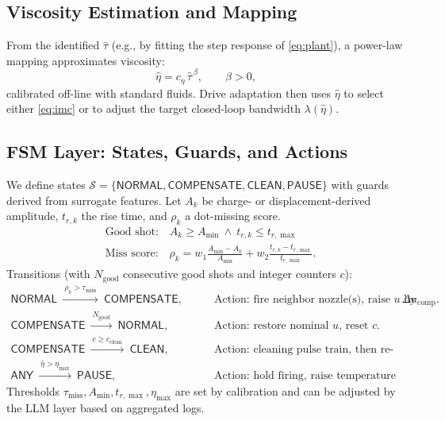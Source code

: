 \subsection{Viscosity Estimation and Mapping}
From the identified $\hat{\tau}$ (e.g., by fitting the step response of \eqref{eq:plant}),
a power-law mapping approximates viscosity:
\begin{equation}
\hat{\eta} = c_\eta\,\hat{\tau}^{\,\beta},\qquad \beta>0,
\end{equation}
calibrated off-line with standard fluids.
Drive adaptation then uses $\hat{\eta}$ to select either \eqref{eq:imc} or to adjust
the target closed-loop bandwidth $\lambda(\hat{\eta})$.

\subsection{FSM Layer: States, Guards, and Actions}
We define states $\mathcal{S}=\{\textsf{NORMAL},\textsf{COMPENSATE},\textsf{CLEAN},\textsf{PAUSE}\}$
with guards derived from surrogate features.
Let $A_k$ be charge- or displacement-derived amplitude, $t_{r,k}$ the rise time,
and $\rho_k$ a dot-missing score.
\begin{align}
&\text{Good shot:}\quad A_k \ge A_{\min}\ \land\ t_{r,k}\le t_{r,\max}\\
&\text{Miss score:}\quad \rho_k = w_1\frac{A_{\min}-A_k}{A_{\min}} + w_2\frac{t_{r,k}-t_{r,\max}}{t_{r,\max}}.
\end{align}
Transitions (with $N_{\text{good}}$ consecutive good shots and integer counters $c$):
\begin{align}
\textsf{NORMAL}\ \xrightarrow{\ \rho_k>\tau_{\text{miss}}\ }\ \textsf{COMPENSATE},\qquad
&\text{Action: fire neighbor nozzle(s), raise $u$ by }\Delta u_{\text{comp}}.\\
\textsf{COMPENSATE}\ \xrightarrow{\ N_{\text{good}}\ }\ \textsf{NORMAL},\qquad
&\text{Action: restore nominal $u$, reset $c$.}\\
\textsf{COMPENSATE}\ \xrightarrow{\ c\ge c_{\text{clean}}\ }\ \textsf{CLEAN},\qquad
&\text{Action: cleaning pulse train, then re-test.}\\
\textsf{ANY}\ \xrightarrow{\ \hat{\eta}>\eta_{\max}\ }\ \textsf{PAUSE},\qquad
&\text{Action: hold firing, raise temperature or dilute per recipe.}
\end{align}
Thresholds $\tau_{\text{miss}},A_{\min},t_{r,\max},\eta_{\max}$ are set by calibration and
can be adjusted by the LLM layer based on aggregated logs.

